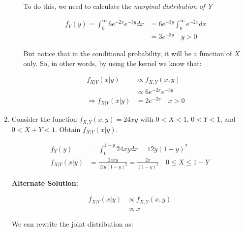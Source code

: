 \documentclass{article}
\begin{document}
\begin{enumerate}
\begin{enumerate}
        To do this, we need to calculate the \textit{marginal distribution of Y}

        \begin{equation*}
        \begin{split}
            f_Y(y) = \int_0^\infty 6e^{-2x}e^{-3y} dx &= 6e^{-3y}\int_0^\infty e^{-2x}dx\\
            &= 3e^{-3y} \quad y>0
        \end{split}
        \end{equation*}

        But notice that in the conditional probability, it will be a function of $X$ only. So, in other words, by using the kernel we know that:

        \begin{equation*}
            \begin{split}
                f_{X|Y} (x|y) &\propto f_{X,Y}(x,y)\\
                &\propto 6e^{-2x}e^{-3y}\\
                \Rightarrow f_{X|Y}(x|y) &= 2e^{-2x}\quad x>0
            \end{split}
        \end{equation*}
    \end{enumerate}

    \item Consider the function $f_{X,Y}(x,y) = 24xy$ with $0<X<1$, $0<Y<1$, and $0<X+Y<1$. Obtain $f_{X|Y}(x|y)$.

    \begin{equation*}
        \begin{split}
            f_Y(y) &= \int_0^{1-y} 24xy dx = 12y(1-y)^2\\
            f_{X|Y}(x|y) &= \frac{24xy}{12y(1-y)^2} = \frac{2x}{(1-y)^2} \quad 0 \leq X \leq 1-Y
        \end{split}
    \end{equation*}

    \textbf{Alternate Solution:}

    \begin{equation*}
        \begin{split}
            f_{X|Y}(x|y) &\propto f_{X,Y}(x,y)\\
                    &\propto x
        \end{split}
    \end{equation*}

    We can rewrite the joint distribution as:


\end{enumerate}
\end{document}
